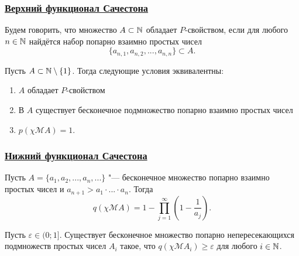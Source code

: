 \begin{frame}\frametitle{\underline{Верхний функционал Сачестона}}

	\begin{ddefinition}
		Будем говорить, что множество $A\subset\mathbb{N}$ обладает $P$-свойством,
		если для любого $n\in\mathbb{N}$ найдётся набор попарно взаимно простых чисел
		\begin{equation}
			\{a_{n,1}, a_{n,2}, ..., a_{n,n}  \} \subset A
			.
		\end{equation}
	\end{ddefinition}

	\begin{ttheorem}
		Пусть $A\subset \mathbb{N}\setminus\{1\}$.
		Тогда следующие условия эквивалентны:
		\begin{enumerate}%
			\item
				$A$ обладает $P$-свойством
			\item
				В $A$ существует бесконечное подмножество попарно взаимно простых чисел
			\item
				$p(\chi\mathscr{M}A)=1$.
		\end{enumerate}
	\end{ttheorem}

\end{frame}


\begin{frame}\frametitle{\underline{Нижний функционал Сачестона}}


	\begin{ttheorem}
		Пусть $A = \{a_1, a_2, ..., a_n,...\}$ "--- бесконечное множество попарно взаимно простых чисел
		и $a_{n+1}>a_1\cdot...\cdot a_n$.
		Тогда
		\begin{equation}
			q(\chi\mathscr{M}A) = 1-\prod_{j=1}^\infty \left(1-\frac{1}{a_j}\right)
			.
		\end{equation}
	\end{ttheorem}

	\begin{llemma}
		Пусть $\varepsilon \in  (0; 1{]}$.
		Существует бесконечное множество попарно непересекающихся подмножеств простых чисел
		$A_i$ такое, что $q(\chi\mathscr{M}A_i)\geq\varepsilon$ для любого $i\in\mathbb{N}$.
	\end{llemma}
\end{frame}
